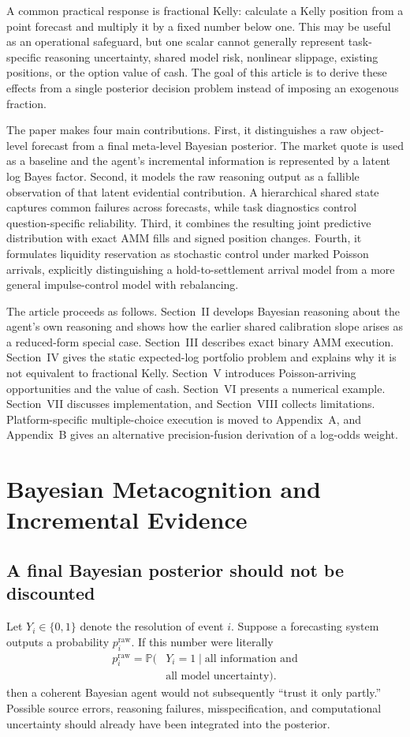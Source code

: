\documentclass[journal,a4paper]{IEEEtran}
\newcommand{\Prb}{\mathbb{P}}
\begin{document}
A common practical response is fractional Kelly: calculate a Kelly position from a point forecast and multiply it by a fixed number below one. This may be useful as an operational safeguard, but one scalar cannot generally represent task-specific reasoning uncertainty, shared model risk, nonlinear slippage, existing positions, or the option value of cash. The goal of this article is to derive these effects from a single posterior decision problem instead of imposing an exogenous fraction.

The paper makes four main contributions. First, it distinguishes a raw object-level forecast from a final meta-level Bayesian posterior. The market quote is used as a baseline and the agent's incremental information is represented by a latent log Bayes factor. Second, it models the raw reasoning output as a fallible observation of that latent evidential contribution. A hierarchical shared state captures common failures across forecasts, while task diagnostics control question-specific reliability. Third, it combines the resulting joint predictive distribution with exact AMM fills and signed position changes. Fourth, it formulates liquidity reservation as stochastic control under marked Poisson arrivals, explicitly distinguishing a hold-to-settlement arrival model from a more general impulse-control model with rebalancing.

The article proceeds as follows. Section~II develops Bayesian reasoning about the agent's own reasoning and shows how the earlier shared calibration slope arises as a reduced-form special case. Section~III describes exact binary AMM execution. Section~IV gives the static expected-log portfolio problem and explains why it is not equivalent to fractional Kelly. Section~V introduces Poisson-arriving opportunities and the value of cash. Section~VI presents a numerical example. Section~VII discusses implementation, and Section~VIII collects limitations. Platform-specific multiple-choice execution is moved to Appendix~A, and Appendix~B gives an alternative precision-fusion derivation of a log-odds weight.

\section{Bayesian Metacognition and Incremental Evidence}
\subsection{A final Bayesian posterior should not be discounted}
Let $Y_i\in\{0,1\}$ denote the resolution of event $i$. Suppose a forecasting system outputs a probability $p_i^{\mathrm{raw}}$. If this number were literally
\begin{equation}
\begin{split}
p_i^{\mathrm{raw}}
=\Prb(&Y_i=1\mid\text{all information and}\\
&\text{all model uncertainty}).
\end{split}
\end{equation}
then a coherent Bayesian agent would not subsequently ``trust it only partly.'' Possible source errors, reasoning failures, misspecification, and computational uncertainty should already have been integrated into the posterior.
\end{document}
